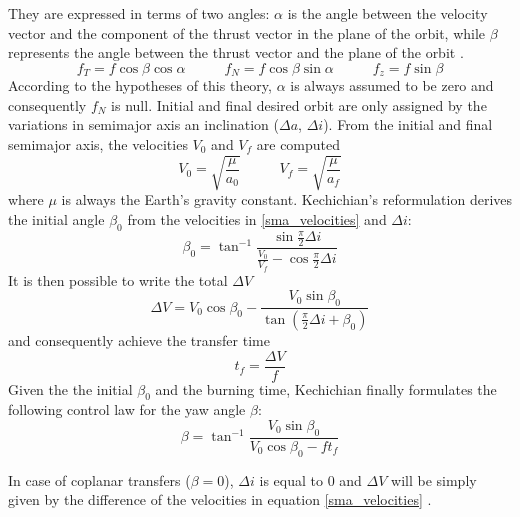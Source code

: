 They are expressed in terms of two angles: 
$\alpha$ is the angle between the velocity vector and the component of the thrust vector in the plane of the orbit,
while $\beta$ represents the angle between the thrust vector and the plane of the orbit \cite{edelbaum1961propulsion}.
\begin{equation} \label{acceleration_thrust_components}
    f_T = f \cos{\beta} \cos{\alpha} \;\;\;\;\;\;\;\;\;\; f_N = f \cos{\beta} \sin{\alpha} \;\;\;\;\;\;\;\;\;\; f_z = f \sin{\beta}
\end{equation}
According to the hypotheses of this theory, $\alpha$ is always assumed to be zero and consequently $f_N$ is null.
Initial and final desired orbit are only assigned by the variations in semimajor axis an inclination ($\Delta a$, $\Delta i$).
From the initial and final semimajor axis, the velocities $V_0$ and $V_f$ are computed 
\begin{equation} \label{sma_velocities}
    V_0 = \sqrt{\frac{\mu}{a_0}} \;\;\;\;\;\;\;\;\;\; V_f = \sqrt{\frac{\mu}{a_f}}
\end{equation}
where $\mu$ is always the Earth's gravity constant.
Kechichian's reformulation derives the initial angle $\beta_0$ from the velocities in \ref{sma_velocities} and $\Delta i$:
\begin{equation} \label{beta0}
    \beta_0 = \tan^{-1}{\frac{\sin{\frac{\pi}{2}}\Delta i}{\frac{V_0}{V_f} - \cos{\frac{\pi}{2}}\Delta i}}
\end{equation}
It is then possible to write the total $\Delta V$
\begin{equation} \label{deltaV}
    \Delta V = V_0 \cos{\beta_0} - \frac{V_0 \sin{\beta_0}}{\tan{\left(\frac{\pi}{2}\Delta i + \beta_0\right)}}
\end{equation}
and consequently achieve the transfer time
\begin{equation} \label{transfer_time}
    t_f = \frac{\Delta V}{f}
\end{equation}
Given the the initial $\beta_0$ and the burning time, Kechichian finally formulates the following control law for the yaw angle $\beta$:
\begin{equation} \label{yaw_angle_equation}
    \beta = \tan^{-1}{\frac{V_0 \sin{\beta_0}}{V_0 \cos{\beta_0} - f t_f}}
\end{equation} 

In case of coplanar transfers ($\beta = 0$), $\Delta i$ is equal to 0 and $\Delta V$ will be simply given by the difference of the velocities in equation \ref{sma_velocities} \cite{kechichian1992reformulation}.



